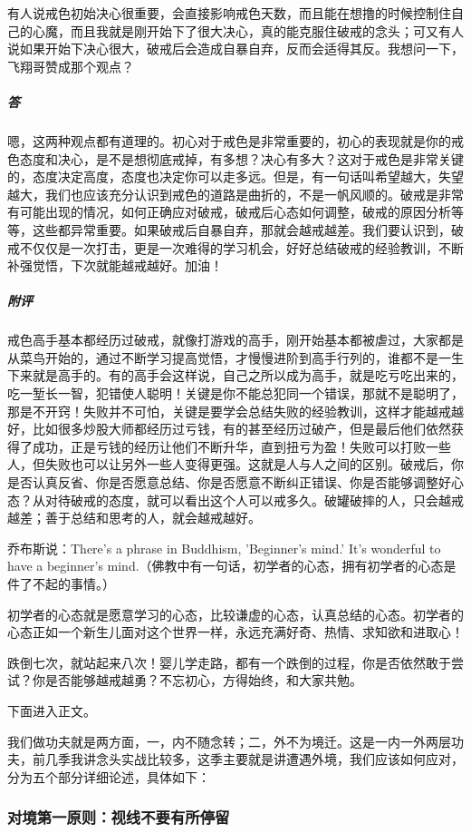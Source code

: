 \begin{case}
    有人说戒色初始决心很重要，会直接影响戒色天数，而且能在想撸的时候控制住自己的心魔，而且我就是刚开始下了很大决心，真的能克服住破戒的念头；可又有人说如果开始下决心很大，破戒后会造成自暴自弃，反而会适得其反。我想问一下，飞翔哥赞成那个观点？
    \subparagraph{答} 嗯，这两种观点都有道理的。初心对于戒色是非常重要的，初心的表现就是你的戒色态度和决心，是不是想彻底戒掉，有多想？决心有多大？这对于戒色是非常关键的，态度决定高度，态度也决定你可以走多远。但是，有一句话叫希望越大，失望越大，我们也应该充分认识到戒色的道路是曲折的，不是一帆风顺的。破戒是非常有可能出现的情况，如何正确应对破戒，破戒后心态如何调整，破戒的原因分析等等，这些都异常重要。如果破戒后自暴自弃，那就会越戒越差。我们要认识到，破戒不仅仅是一次打击，更是一次难得的学习机会，好好总结破戒的经验教训，不断补强觉悟，下次就能越戒越好。加油！
    \subparagraph{附评} 戒色高手基本都经历过破戒，就像打游戏的高手，刚开始基本都被虐过，大家都是从菜鸟开始的，通过不断学习提高觉悟，才慢慢进阶到高手行列的，谁都不是一生下来就是高手的。有的高手会这样说，自己之所以成为高手，就是吃亏吃出来的，吃一堑长一智，犯错使人聪明！关键是你不能总犯同一个错误，那就不是聪明了，那是不开窍！失败并不可怕，关键是要学会总结失败的经验教训，这样才能越戒越好，比如很多炒股大师都经历过亏钱，有的甚至经历过破产，但是最后他们依然获得了成功，正是亏钱的经历让他们不断升华，直到扭亏为盈！失败可以打败一些人，但失败也可以让另外一些人变得更强。这就是人与人之间的区别。破戒后，你是否认真反省、你是否愿意总结、你是否愿意不断纠正错误、你是否能够调整好心态？从对待破戒的态度，就可以看出这个人可以戒多久。破罐破摔的人，只会越戒越差；善于总结和思考的人，就会越戒越好。

    乔布斯说：There's a phrase in Buddhism, 'Beginner's mind.' It's wonderful to have a beginner's mind.（佛教中有一句话，初学者的心态，拥有初学者的心态是件了不起的事情。）

    初学者的心态就是愿意学习的心态，比较谦虚的心态，认真总结的心态。初学者的心态正如一个新生儿面对这个世界一样，永远充满好奇、热情、求知欲和进取心！

    跌倒七次，就站起来八次！婴儿学走路，都有一个跌倒的过程，你是否依然敢于尝试？你是否能够越戒越勇？不忘初心，方得始终，和大家共勉。
\end{case}

下面进入正文。

我们做功夫就是两方面，一，内不随念转；二，外不为境迁。这是一内一外两层功夫，前几季我讲念头实战比较多，这季主要就是讲遭遇外境，我们应该如何应对，分为五个部分详细论述，具体如下：

\subsubsection{对境第一原则：视线不要有所停留}


